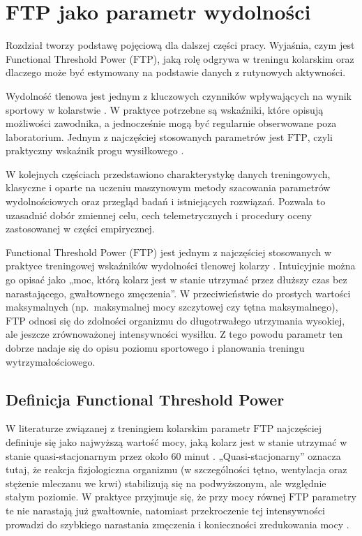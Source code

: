


\chapter{FTP jako parametr wydolności}

Rozdział tworzy podstawę pojęciową dla dalszej części pracy. Wyjaśnia, czym jest Functional Threshold Power ($\mathrm{FTP}$), jaką rolę odgrywa w treningu kolarskim oraz dlaczego może być estymowany na podstawie danych z rutynowych aktywności.

Wydolność tlenowa jest jednym z kluczowych czynników wpływających na wynik sportowy w kolarstwie \parencite{borszcz2018ftp}. W praktyce potrzebne są wskaźniki, które opisują możliwości zawodnika, a jednocześnie mogą być regularnie obserwowane poza laboratorium. Jednym z najczęściej stosowanych parametrów jest $\mathrm{FTP}$, czyli praktyczny wskaźnik progu wysiłkowego \parencite{borszcz2018ftp,allen2019power,gavin2012ftp_lt_field}.

W kolejnych częściach przedstawiono charakterystykę danych treningowych, klasyczne i oparte na uczeniu maszynowym metody szacowania parametrów wydolnościowych oraz przegląd badań i istniejących rozwiązań. Pozwala to uzasadnić dobór zmiennej celu, cech telemetrycznych i procedury oceny zastosowanej w części empirycznej.

Functional Threshold Power ($\mathrm{FTP}$) jest jednym z najczęściej stosowanych w praktyce treningowej wskaźników wydolności tlenowej kolarzy \parencite{borszcz2018ftp,allen2019power}.
Intuicyjnie można go opisać jako „moc, którą kolarz jest w stanie utrzymać przez dłuższy czas bez narastającego, gwałtownego zmęczenia”.
W przeciwieństwie do prostych wartości maksymalnych (np.\ maksymalnej mocy szczytowej czy tętna maksymalnego), $\mathrm{FTP}$ odnosi się do zdolności organizmu do długotrwałego utrzymania wysokiej, ale jeszcze zrównoważonej intensywności wysiłku.
Z tego powodu parametr ten dobrze nadaje się do opisu poziomu sportowego i planowania treningu wytrzymałościowego.

\section{Definicja Functional Threshold Power}

W literaturze związanej z treningiem kolarskim parametr $\mathrm{FTP}$ najczęściej definiuje się jako najwyższą wartość mocy, jaką kolarz jest w stanie utrzymać w stanie quasi-stacjonarnym przez około $60$ minut \parencite{borszcz2018ftp,allen2019power}.
„Quasi-stacjonarny” oznacza tutaj, że reakcja fizjologiczna organizmu (w szczególności tętno, wentylacja oraz stężenie mleczanu we krwi) stabilizują się na podwyższonym, ale względnie stałym poziomie.
W praktyce przyjmuje się, że przy mocy równej $\mathrm{FTP}$ parametry te nie narastają już gwałtownie, natomiast przekroczenie tej intensywności prowadzi do szybkiego narastania zmęczenia i konieczności zredukowania mocy \parencite{borszcz2018ftp,karsten2021cpftp}.

